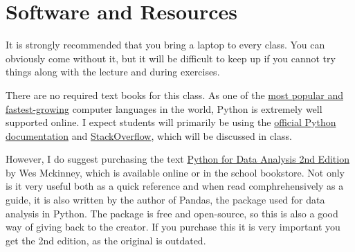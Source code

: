 \documentclass{article}
\begin{document}
\section*{Software and Resources}
It is strongly recommended that you bring a laptop to every class.  You can obviously come without it, but it will be difficult to keep up if you cannot try things along with the lecture and during exercises.

There are no required text books for this class.  As one of the \href{https://insights.stackoverflow.com/survey/2018/\#technology}{most popular and fastest-growing} computer languages in the world, Python is extremely well supported online.  I expect students will primarily be using the \href{https://docs.python.org/3/}{official Python documentation} and \href{https://stackoverflow.com/}{StackOverflow}, which will be discussed in class.  

However, I do suggest purchasing the text \href{https://www.amazon.com/Python-Data-Analysis-Wrangling-IPython/dp/1491957662/ref=sr_1_3?ie=UTF8\&qid=1550574627\&sr=8-3\&keywords=python+for+data+analysis+2nd}{Python for Data Analysis 2nd Edition} by Wes Mckinney, which is available online or in the school bookstore.  Not only is it very useful both as a quick reference and when read comphrehensively as a guide, it is also written by the author of Pandas, the package used for data analysis in Python.  The package is free and open-source, so this is also a good way of giving back to the creator.  If you purchase this it is very important you get the 2nd edition, as the original is outdated.
\end{document}
